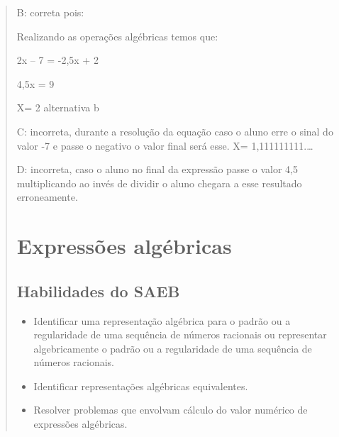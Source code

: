 \begin{quote}
\begin{escolha}
B: correta pois:

Realizando as operações algébricas temos que:

2x -- 7 = -2,5x + 2

4,5x = 9

X= 2 alternativa b

C: incorreta, durante a resolução da equação caso o aluno erre o sinal
do valor -7 e passe o negativo o valor final será esse. X=
1,111111111.\ldots{}

D: incorreta, caso o aluno no final da expressão passe o valor 4,5
multiplicando ao invés de dividir o aluno chegara a esse resultado
erroneamente.

\chapter{Expressões algébricas}

\section{Habilidades do SAEB}

\begin{itemize}
\item
  Identificar uma representação algébrica para o padrão ou a
  regularidade de uma sequência de números racionais ou representar
  algebricamente o padrão ou a regularidade de uma sequência de números
  racionais.
\item
  Identificar representações algébricas equivalentes.
\item
  Resolver problemas que envolvam cálculo do valor numérico de expressões
  algébricas.
\end{itemize}

\end{escolha}
\end{quote}
